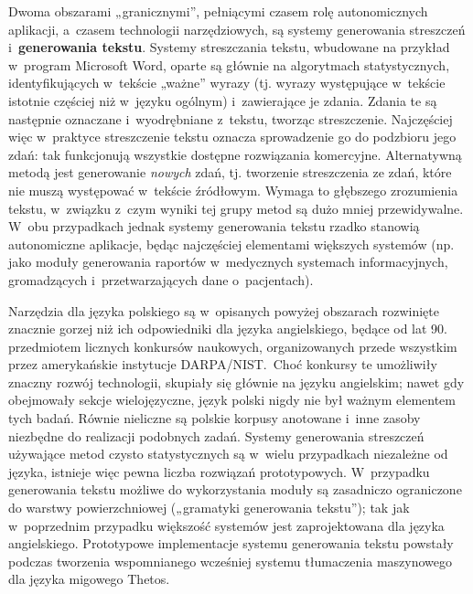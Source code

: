 \begin{multicols}{2}
Dwoma obszarami „granicznymi”, pełniącymi czasem rolę
autonomicznych aplikacji, a~czasem technologii narzędziowych, są
systemy generowania streszczeń i~\textbf{generowania tekstu}. Systemy
streszczania tekstu, wbudowane na przykład w~program Microsoft Word,
oparte są głównie na algorytmach statystycznych, identyfikujących
w~tekście „ważne” wyrazy (tj. wyrazy występujące w~tekście
istotnie częściej niż w~języku ogólnym) i~zawierające je zdania.
Zdania te są następnie oznaczane i~wyodrębniane z~tekstu, tworząc
streszczenie. Najczęściej więc w~praktyce streszczenie tekstu
oznacza sprowadzenie go do podzbioru jego zdań: tak funkcjonują
wszystkie dostępne rozwiązania komercyjne. Alternatywną metodą
jest generowanie \emph{nowych} zdań, tj. tworzenie streszczenia ze
zdań, które nie muszą występować w~tekście źródłowym. Wymaga
to głębszego zrozumienia tekstu, w~związku z~czym wyniki tej grupy
metod są dużo mniej przewidywalne. W~obu przypadkach jednak systemy
generowania tekstu rzadko stanowią autonomiczne aplikacje, będąc
najczęściej elementami większych systemów (np. jako moduły
generowania raportów w~medycznych systemach informacyjnych,
gromadzących i~przetwarzających dane o~pacjentach). 


Narzędzia dla języka polskiego są w~opisanych powyżej obszarach
rozwinięte znacznie gorzej niż ich odpowiedniki dla języka
angielskiego, będące od lat 90. przedmiotem licznych konkursów
naukowych, organizowanych przede wszystkim przez amerykańskie
instytucje DARPA/NIST.~Choć konkursy te umożliwiły znaczny rozwój
technologii, skupiały się głównie na języku angielskim; nawet gdy
obejmowały sekcje wielojęzyczne, język polski nigdy nie był
ważnym elementem tych badań. Równie nieliczne są polskie korpusy
anotowane i~inne zasoby niezbędne do realizacji podobnych zadań.
Systemy generowania streszczeń używające metod czysto
statystycznych są w~wielu przypadkach niezależne od języka,
istnieje więc pewna liczba rozwiązań prototypowych. W~przypadku
generowania tekstu możliwe do wykorzystania moduły są zasadniczo
ograniczone do warstwy powierzchniowej („gramatyki generowania
tekstu”); tak jak w~poprzednim przypadku większość systemów jest
zaprojektowana dla języka angielskiego. Prototypowe implementacje
systemu generowania tekstu powstały podczas tworzenia wspomnianego
wcześniej systemu tłumaczenia maszynowego dla języka migowego
Thetos. 


\end{multicols}
